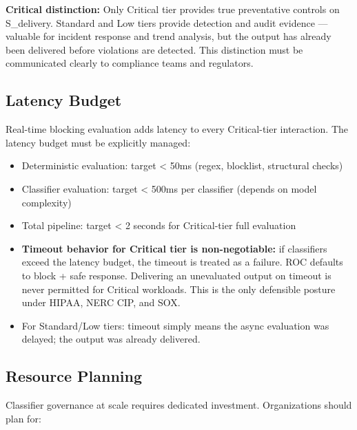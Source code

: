 \textbf{Critical distinction:} Only Critical tier provides true preventative controls on S\_\allowbreak{}delivery. Standard and Low tiers provide detection and audit evidence --- valuable for incident response and trend analysis, but the output has already been delivered before violations are detected. This distinction must be communicated clearly to compliance teams and regulators.

\subsection{Latency Budget}


Real-time blocking evaluation adds latency to every Critical-tier interaction. The latency budget must be explicitly managed:

\begin{itemize}
  \item Deterministic evaluation: target < 50ms (regex, blocklist, structural checks)
  \item Classifier evaluation: target < 500ms per classifier (depends on model complexity)
  \item Total pipeline: target < 2 seconds for Critical-tier full evaluation
  \item \textbf{Timeout behavior for Critical tier is non-negotiable:} if classifiers exceed the latency budget, the timeout is treated as a failure. ROC defaults to block + safe response. Delivering an unevaluated output on timeout is never permitted for Critical workloads. This is the only defensible posture under HIPAA, NERC CIP, and SOX.
  \item For Standard/Low tiers: timeout simply means the async evaluation was delayed; the output was already delivered.
\end{itemize}


\subsection{Resource Planning}


Classifier governance at scale requires dedicated investment. Organizations should plan for:

